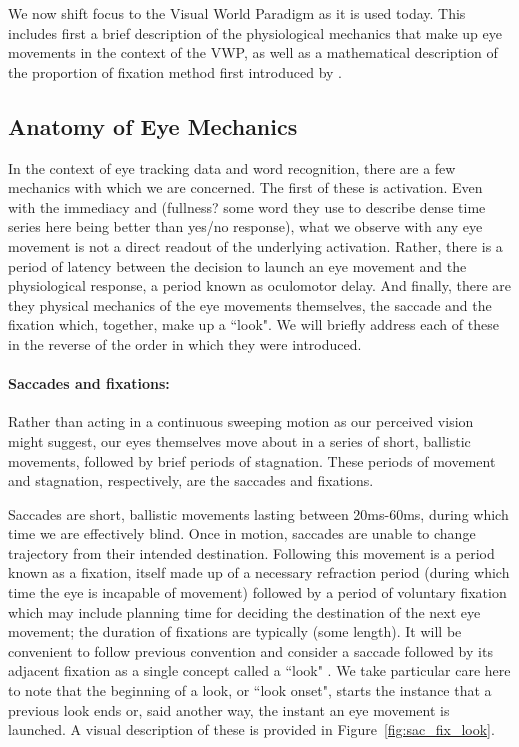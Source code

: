 We now shift focus to the Visual World Paradigm as it is used today. This includes first a brief description of the physiological mechanics that make up eye movements in the context of the VWP, as well as a mathematical description of the proportion of fixation method first introduced by \citet{allopenna1998tracking}.  


\subsection{Anatomy of Eye Mechanics}

In the context of eye tracking data and word recognition, there are a few mechanics with which we are concerned. The first of these is activation. Even with the immediacy and (fullness? some word they use to describe dense time series here being better than yes/no response), what we observe with any eye movement is not a direct readout of the underlying activation.  Rather, there is a period of latency between the decision to launch an eye movement and the physiological response, a period known as oculomotor delay. And finally, there are they physical mechanics of the eye movements themselves, the saccade and the fixation which, together, make up a ``look". We will briefly address each of these in the reverse of the order in which they were introduced.



\paragraph{Saccades and fixations:} Rather than acting in a continuous sweeping motion as our perceived vision might suggest, our eyes themselves move about in a series of short, ballistic movements, followed by brief periods of stagnation. These periods of movement and stagnation, respectively, are the saccades and fixations. 

Saccades are short, ballistic movements lasting between 20ms-60ms, during which time we are effectively blind. Once in motion, saccades are unable to change trajectory from their intended destination. Following this movement is a period known as a fixation, itself made up of a necessary refraction period (during which time the eye is incapable of movement) followed by a period of voluntary fixation which may include planning time for deciding the destination of the next eye movement; the duration of fixations are typically (some length). It will be convenient to follow previous convention and consider a saccade followed by its adjacent fixation as a single concept called a ``look" \cite{mcmurray2002look}. We take particular care here to note that the beginning of a look, or ``look onset", starts the instance that a previous look ends or, said another way, the instant an eye movement is launched. A visual description of these is provided in Figure~\ref{fig:sac_fix_look}.



